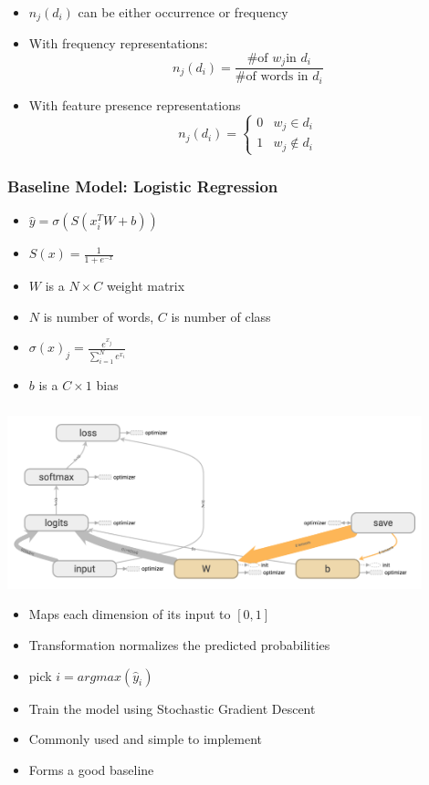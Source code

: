 \documentclass{beamer}
\begin{document}
\begin{frame}
\frametitle{}
    \begin{itemize}
        \item $n_j(d_i)$ can be either occurrence or frequency
        \item With frequency representations:
        $$n_j(d_i) = \frac{\text{\# of }w_j \text{in } d_i}{\text{\# of words in } d_i}$$
        \item With feature presence representations
        $$n_j(d_i) = \begin{cases} 
        0 & w_j \in d_i\\
        1 & w_j \notin d_i
        \end{cases}$$
    \end{itemize}
\end{frame}

\begin{frame}
\frametitle{Baseline Model: Logistic Regression}
    \begin{itemize}
        \item $\hat{y} = \sigma(S(x^T_i W +b))$
        \item $S(x) = \frac{1}{1+e^{-x}}$
        \item $W$ is a $N \times C$ weight matrix
        \item $N$ is number of words, $C$ is number of class
        \item $\sigma (x)_{j}={\frac {e^{x_{j}}}{\sum _{i=1}^{N}e^{x_{i}}}}$
        \item $b$ is a $C \times 1$ bias
    \end{itemize}
\end{frame}

\begin{frame}
\frametitle{}
    \center\includegraphics[width=0.9\textwidth]{figure/model_architecture}
    \begin{itemize}
        \item Maps each dimension of its input to $[0, 1]$
        \item Transformation normalizes the predicted probabilities
        \item pick $i=argmax(\hat{y}_i)$
        \item Train the model using Stochastic Gradient Descent
        \item Commonly used and simple to implement
        \item Forms a good baseline
    \end{itemize}
\end{frame}
\end{document}
